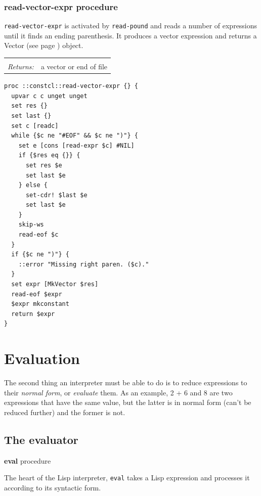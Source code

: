 \documentclass[twoside,9pt]{report}
\begin{document}
\subsection{read-vector-expr procedure}
\label{read-vector-expr-procedure}


\texttt{read-vector-expr} is activated by \texttt{read-pound} and reads a number of expressions until it finds an ending parenthesis. It produces a vector expression and returns a Vector (see page \pageref{vectors}) object.

\noindent\begin{tabular}{ |p{1.5cm} p{8cm}| }
\hline
\rowcolor[HTML]{CCCCCC} \multicolumn{2}{|l|}{\bf read-vector-expr (internal)} \\
\textit{Returns:} & a vector or end of file \\
\hline
\end{tabular}
\begin{lstlisting}
proc ::constcl::read-vector-expr {} {
  upvar c c unget unget
  set res {}
  set last {}
  set c [readc]
  while {$c ne "#EOF" && $c ne ")"} {
    set e [cons [read-expr $c] #NIL]
    if {$res eq {}} {
      set res $e
      set last $e
    } else {
      set-cdr! $last $e
      set last $e
    }
    skip-ws
    read-eof $c
  }
  if {$c ne ")"} {
    ::error "Missing right paren. ($c)."
  }
  set expr [MkVector $res]
  read-eof $expr
  $expr mkconstant
  return $expr
}
\end{lstlisting}
\chapter{Evaluation}
\label{evaluation}


The second thing an interpreter must be able to do is to reduce expressions to their \emph{normal form}, or \emph{evaluate} them. As an example, 2 + 6 and 8 are two expressions that have the same value, but the latter is in normal form (can't be reduced further) and the former is not.

\section{The evaluator}
\label{the-evaluator}


\textbf{eval} procedure


The heart of the Lisp interpreter, \texttt{eval} takes a Lisp expression and processes it according to its syntactic form.
\end{document}
